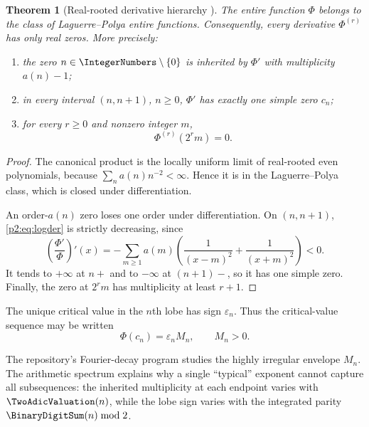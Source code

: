 \documentclass[11pt]{article}
\numberwithin{equation}{section}
\newtheorem{theorem}{Theorem}[section]
\theoremstyle{definition}
\theoremstyle{remark}
\begin{document}
\begin{theorem}[Real-rooted derivative hierarchy \Derived]
\label{p2:thm:LP}
The entire function $\Phi$ belongs to the class of Laguerre--Polya entire functions.  Consequently,
every derivative $\Phi^{(r)}$ has only real zeros.  More precisely:
\begin{enumerate}
\item the zero $n\in\IntegerNumbers\setminus\{0\}$ is inherited by $\Phi'$ with multiplicity
      $a(n)-1$;
\item in every interval $(n,n+1)$, $n\ge0$, $\Phi'$ has exactly one simple zero
      $c_n$;
\item for every $r\ge0$ and nonzero integer $m$,
      \begin{equation}
       \Phi^{(r)}(2^r m)=0.                                \label{p2:eq:derivative-lattice}
      \end{equation}
\end{enumerate}
\end{theorem}

\begin{proof}
The canonical product is the locally uniform limit of real-rooted even
polynomials, because $\sum_n a(n)n^{-2}<\infty$.  Hence it is in the
Laguerre--Polya class, which is closed under differentiation.

An order-$a(n)$ zero loses one order under differentiation.  On $(n,n+1)$,
\eqref{p2:eq:logder} is strictly decreasing, since
\[
 \left(\frac{\Phi'}{\Phi}\right)'(x)
 =-\sum_{m\ge1}a(m)\left(\frac1{(x-m)^2}+\frac1{(x+m)^2}\right)<0.
\]
It tends to $+\infty$ at $n+$ and to $-\infty$ at $(n+1)-$, so it has one
simple zero.  Finally, the zero at $2^rm$ has multiplicity at least $r+1$.
\end{proof}

\begin{corollary}
The unique critical value in the $n$th lobe has sign $\varepsilon_n$.  Thus the
critical-value sequence may be written
\begin{equation}
 \Phi(c_n)=\varepsilon_n M_n,\qquad M_n>0.                 \label{p2:eq:critical-sign}
\end{equation}
\end{corollary}

The repository's Fourier-decay program studies the highly irregular envelope
$M_n$.  The arithmetic spectrum explains why a single ``typical'' exponent cannot
capture all subsequences: the inherited multiplicity at each endpoint varies
with $\TwoAdicValuation(n)$, while the lobe sign varies with the integrated parity
$\BinaryDigitSum(n)\bmod2$.
\end{document}
